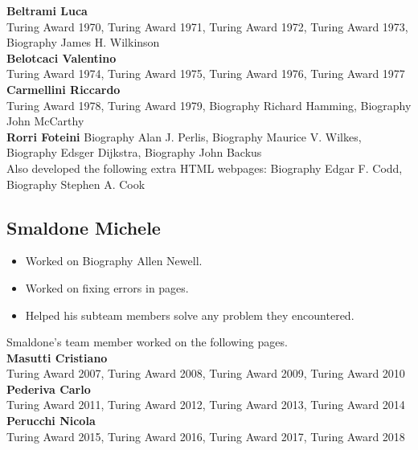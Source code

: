 \documentclass[11pt]{article}
\begin{document}
\noindent\textbf{Beltrami Luca}\\
Turing Award 1970, Turing Award 1971, Turing Award 1972, Turing Award 1973, Biography James H. Wilkinson\\

\noindent\textbf{Belotcaci Valentino}\\
Turing Award 1974, Turing Award 1975, Turing Award 1976, Turing Award 1977\\

\noindent\textbf{Carmellini Riccardo}\\
Turing Award 1978, Turing Award 1979, Biography Richard Hamming, Biography John McCarthy\\

\noindent\textbf{Rorri Foteini}
Biography Alan J. Perlis, Biography Maurice V. Wilkes, Biography Edsger Dijkstra, Biography John Backus\\
Also developed the following extra HTML webpages: Biography Edgar F. Codd, Biography Stephen A. Cook\\

\subsection*{Smaldone Michele}
\begin{itemize}
 \item Worked on Biography Allen Newell.
  \item Worked on fixing errors in pages.
 \item Helped his subteam members solve any problem they encountered.
\end{itemize}

\noindent Smaldone's team member worked on the following pages.\\

\noindent\textbf{Masutti Cristiano}\\
Turing Award 2007, Turing Award 2008, Turing Award 2009, Turing Award 2010\\

\noindent\textbf{Pederiva Carlo}\\
Turing Award 2011, Turing Award 2012, Turing Award 2013, Turing Award 2014\\

\noindent\textbf{Perucchi Nicola}\\
Turing Award 2015, Turing Award 2016, Turing Award 2017, Turing Award 2018\\
\end{document}

